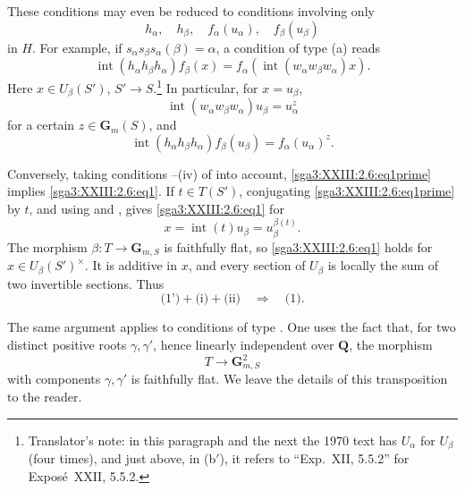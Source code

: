 These conditions may even be reduced to conditions involving only
\[
  h_\alpha,\quad h_\beta,\quad
  f_\alpha(u_\alpha),\quad f_\beta(u_\beta)
\]
in \(H\). For example, if
\(s_\alpha s_\beta s_\alpha(\beta)=\alpha\), a condition of type
(a) reads
\begin{equation}
  \operatorname{int}(h_\alpha h_\beta h_\alpha)f_\beta(x)
    =f_\alpha\!\left(
       \operatorname{int}(w_\alpha w_\beta w_\alpha)x
     \right).
  \tag{1}
  \label{sga3:XXIII:2.6:eq1}
\end{equation}
Here \(x\in U_\beta(S')\), \(S'\to S\).\footnote{Translator's note: in this paragraph and the
next the 1970 text has \(U_\alpha\) for \(U_\beta\) (four times), and just above, in
(b\('\)), it refers to ``Exp.~XII, 5.5.2'' for Exposé~XXII, 5.5.2.} In particular, for
\(x=u_\beta\),
\[
  \operatorname{int}(w_\alpha w_\beta w_\alpha)u_\beta
    =u_\alpha^z
\]
for a certain \(z\in\mathbf G_m(S)\), and
\begin{equation}
  \operatorname{int}(h_\alpha h_\beta h_\alpha)f_\beta(u_\beta)
    =f_\alpha(u_\alpha)^z.
  \tag{1\('\)}
  \label{sga3:XXIII:2.6:eq1prime}
\end{equation}

Conversely, taking conditions --(iv) of  into account,
\eqref{sga3:XXIII:2.6:eq1prime} implies
\eqref{sga3:XXIII:2.6:eq1}. If \(t\in T(S')\), conjugating
\eqref{sga3:XXIII:2.6:eq1prime} by \(t\), and using  and ,
gives \eqref{sga3:XXIII:2.6:eq1} for
\[
  x=\operatorname{int}(t)u_\beta=u_\beta^{\beta(t)}.
\]
The morphism \(\beta:T\to\mathbf G_{m,S}\) is faithfully flat, so
\eqref{sga3:XXIII:2.6:eq1} holds for
\(x\in U_\beta(S')^\times\). It is additive in \(x\), and every
section of \(U_\beta\) is locally the sum of two invertible sections.
Thus
\[
  \text{(1')}+\text{(i)}+\text{(ii)}
    \quad\Longrightarrow\quad\text{(1)}.
\]

The same argument applies to conditions of type . One uses the
fact that, for two distinct positive roots \(\gamma,\gamma'\), hence
linearly independent over \(\mathbf Q\), the morphism
\[
  T\longrightarrow\mathbf G_{m,S}^2
\]
with components \(\gamma,\gamma'\) is faithfully flat. We leave the
details of this transposition to the reader.


